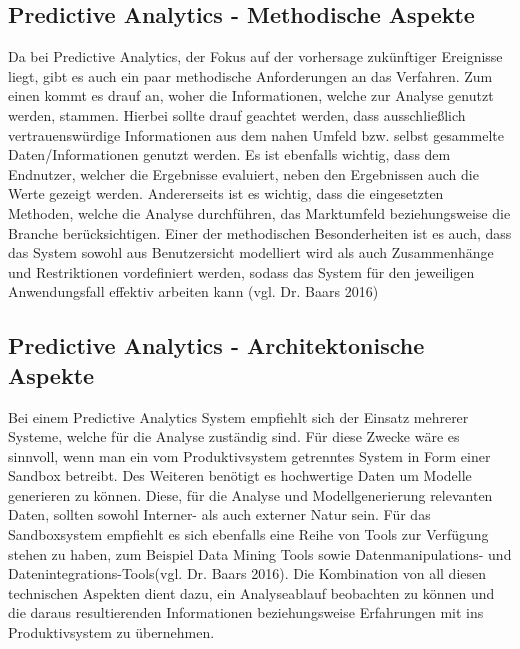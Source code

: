 \documentclass[12pt,twocolumn,twoside]{conference}   %
\begin{document}
\subsection{Predictive Analytics - Methodische Aspekte}
Da bei Predictive Analytics, der Fokus auf der vorhersage zukünftiger Ereignisse liegt, gibt es auch ein paar methodische Anforderungen an das Verfahren. Zum einen kommt es drauf an, woher die Informationen, welche zur Analyse genutzt werden, stammen. Hierbei sollte drauf geachtet werden, dass ausschließlich vertrauenswürdige Informationen aus dem nahen Umfeld bzw. selbst gesammelte Daten/Informationen genutzt werden. Es ist ebenfalls wichtig, dass dem Endnutzer, welcher die Ergebnisse evaluiert, neben den Ergebnissen auch die Werte gezeigt werden. Andererseits ist es wichtig, dass die eingesetzten Methoden, welche die Analyse durchführen, das Marktumfeld beziehungsweise die Branche berücksichtigen. Einer der methodischen Besonderheiten ist es auch, dass das System sowohl aus Benutzersicht modelliert wird als auch Zusammenhänge und Restriktionen vordefiniert werden, sodass das System für den jeweiligen Anwendungsfall effektiv arbeiten kann (vgl. Dr. Baars 2016)

\subsection{Predictive Analytics - Architektonische Aspekte}
Bei einem Predictive Analytics System empfiehlt sich der Einsatz mehrerer Systeme, welche für die Analyse zuständig sind. Für diese Zwecke wäre es sinnvoll, wenn man ein vom Produktivsystem getrenntes System in Form einer Sandbox betreibt. Des Weiteren benötigt es hochwertige Daten um Modelle generieren zu können. Diese, für die Analyse und Modellgenerierung relevanten Daten, sollten sowohl Interner- als auch externer Natur sein. Für das Sandboxsystem empfiehlt es sich ebenfalls eine Reihe von Tools zur Verfügung stehen zu haben, zum Beispiel Data Mining Tools sowie Datenmanipulations- und Datenintegrations-Tools(vgl. Dr. Baars 2016). Die Kombination von all diesen technischen Aspekten dient dazu, ein Analyseablauf beobachten zu können und die daraus resultierenden Informationen beziehungsweise Erfahrungen mit ins Produktivsystem zu übernehmen. 
\end{document}
